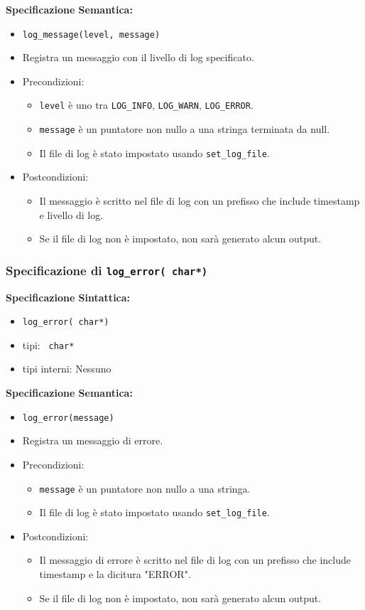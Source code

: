 \documentclass[11pt]{scrartcl} %
\begin{document}
\textbf{Specificazione Semantica:}
\begin{itemize}
	\item \texttt{log\_message(level, message)}
	\item Registra un messaggio con il livello di log specificato.
	\item Precondizioni:
	      \begin{itemize}
		      \item \texttt{level} è uno tra \texttt{LOG\_INFO}, \texttt{LOG\_WARN}, \texttt{LOG\_ERROR}.
		      \item \texttt{message} è un puntatore non nullo a una stringa terminata da null.
		      \item Il file di log è stato impostato usando \texttt{set\_log\_file}.
	      \end{itemize}
	\item Postcondizioni:
	      \begin{itemize}
		      \item Il messaggio è scritto nel file di log con un prefisso che include timestamp e livello di log.
		      \item Se il file di log non è impostato, non sarà generato alcun output.
	      \end{itemize}
\end{itemize}

\subsubsection{Specificazione di \texttt{log\_error( char*)}}

\textbf{Specificazione Sintattica:}
\begin{itemize}
	\item \texttt{log\_error( char*)}
	\item tipi: \texttt{ char*}
	\item tipi interni: Nessuno
\end{itemize}

\textbf{Specificazione Semantica:}
\begin{itemize}
	\item \texttt{log\_error(message)}
	\item Registra un messaggio di errore.
	\item Precondizioni:
	      \begin{itemize}
		      \item \texttt{message} è un puntatore non nullo a una stringa.
		      \item Il file di log è stato impostato usando \texttt{set\_log\_file}.
	      \end{itemize}
	\item Postcondizioni:
	      \begin{itemize}
		      \item Il messaggio di errore è scritto nel file di log con un prefisso che include timestamp e la dicitura "ERROR".
		      \item Se il file di log non è impostato, non sarà generato alcun output.
	      \end{itemize}
\end{itemize}
\end{document}
